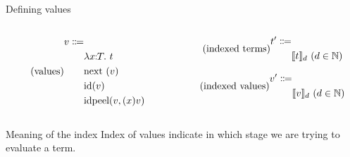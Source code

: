 \documentclass[unicode, aspectratio=169]{beamer}
\begin{document}
    \begin{frame}{Defining values}
        
        \begin{columns}
            \begin{column}{.4\textwidth}
                \begin{equation*}\tag{values}
                    \begin{aligned}
                        v \Coloneqq\\
                            &\mylam{x}{T}{t}\\
                            &\mynext{v}\\
                            &\myid{v}\\
                            &\myidpeel{v}{x}{v}\\
                        \end{aligned}
                \end{equation*}
            \end{column}
            \begin{column}{.4\textwidth}
                \begin{equation*}\tag{indexed terms}
                    \begin{aligned}
                        t' \Coloneqq\\
                        & \llbracket t \rrbracket_{d} \text{ } (d \in \mathbb{N}) \\
                    \end{aligned}
                \end{equation*}  

                \begin{equation*}\tag{indexed values}
                    \begin{aligned}
                        v' \Coloneqq\\
                            & \llbracket v \rrbracket_{d} \text{ } (d \in \mathbb{N})
                    \end{aligned}
                \end{equation*}
            \end{column}
        \end{columns}
    \end{frame}

    \begin{frame}{Meaning of the index}
        Index of values indicate in which stage we are trying to evaluate a term.
        
    \end{frame}
\end{document}
